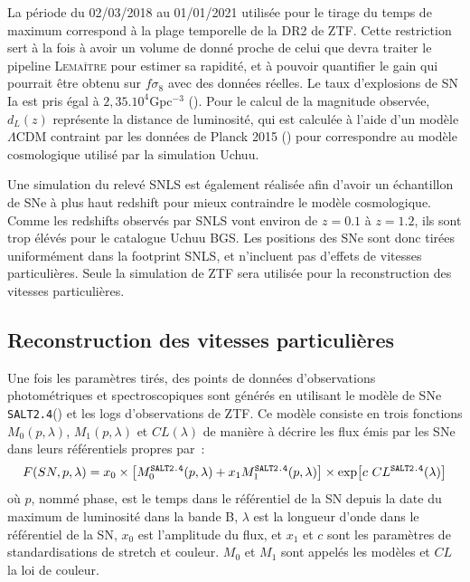 \documentclass{book}
\def\lemaitre{\textsc{Lemaître}\xspace}
\def\saltd{\texttt{SALT2.4}\xspace}
\begin{document}
La période du 02/03/2018 au 01/01/2021 utilisée pour le tirage du temps de maximum correspond à la plage temporelle de la DR2 de ZTF\cite{rigault_ztf_2024}. Cette restriction sert à la fois à avoir un volume de donné proche de celui que devra traiter le pipeline \lemaitre pour estimer sa rapidité, et à pouvoir quantifier le gain qui pourrait être obtenu sur $f\sigma_8$ avec des données réelles. Le taux d'explosions de SN Ia est pris égal à $2,35 .10^4$Gpc$^{-3}$ (\cite{perley_zwicky_2020}).
Pour le calcul de la magnitude observée, $d_L(z)$ représente la distance de luminosité, qui est calculée à l'aide d'un modèle $\Lambda$CDM contraint par les données de Planck 2015 (\cite{planck_collaboration_planck_2016}) pour correspondre au modèle cosmologique utilisé par la simulation Uchuu.

Une simulation du relevé SNLS est également réalisée afin d'avoir un échantillon de SNe à plus haut redshift pour mieux contraindre le modèle cosmologique. Comme les redshifts observés par SNLS vont environ de $z=0.1$ à $z=1.2$, ils sont trop élévés pour le catalogue Uchuu BGS. Les positions des SNe sont donc tirées uniformément dans la footprint SNLS, et n'incluent pas d'effets de vitesses particulières. Seule la simulation de ZTF sera utilisée pour la reconstruction des vitesses particulières.

\subsection{Reconstruction des vitesses particulières}

Une fois les paramètres tirés, des points de données d'observations photométriques et spectroscopiques sont générés en utilisant le modèle de SNe \saltd (\cite{guy_salt2_2007, rigault_ztf_2024}) et les logs d'observations de ZTF. Ce modèle consiste en trois fonctions $M_0(p, \lambda)$, $M_1(p, \lambda)$ et $CL(\lambda)$ de manière à décrire les flux émis par les SNe dans leurs référentiels propres par~:
\begin{equation}
    F(SN, p, \lambda) = x_0 \times \qty[M^{\saltd}_0(p, \lambda) + x_1 M_1^{\saltd}(p, \lambda)] \times \exp[c\ CL^{\saltd}(\lambda)]
\end{equation}
où $p$, nommé phase, est le temps dans le référentiel de la SN depuis la date du maximum de luminosité dans la bande B, $\lambda$ est la longueur d'onde dans le référentiel de la SN, $x_0$ est l'amplitude du flux, et $x_1$ et $c$ sont les paramètres de standardisations de stretch et couleur. $M_0$ et $M_1$ sont appelés les modèles et $CL$ la loi de couleur.
\end{document}
